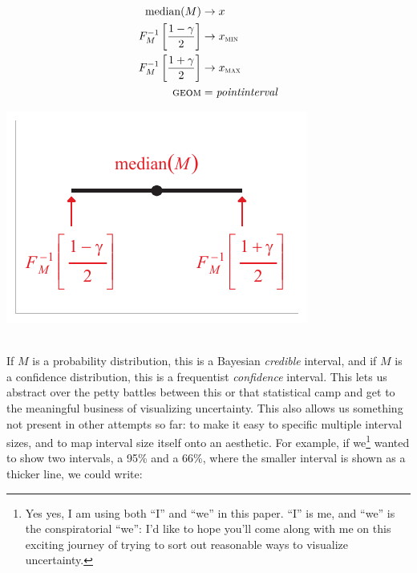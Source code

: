 \documentclass[journal]{vgtc}                     %
\newcommand{\equationfigure}[2]{%
\noindent
\begin{minipage}{.5\columnwidth}
\setlength{\abovedisplayskip}{0pt}
\setlength{\belowdisplayskip}{0pt}
#1\end{minipage}%
\begin{minipage}{.4\columnwidth}\centering #2 \end{minipage}%
\vspace{.5\belowdisplayskip}\\
}
\begin{document}
\equationfigure{
\begin{align*}
\operatorname{median}(M) &\rightarrow x\\
F_M^{-1}\left[\frac{1 - \gamma}{2}\right] &\rightarrow x_\textsc{min}\\
F_M^{-1}\left[\frac{1 + \gamma}{2}\right] &\rightarrow x_\textsc{max}\\
\textsc{geom} &= \mathit{pointinterval}
\end{align*}
}{\includegraphics[width=1.2\columnwidth]{figs/3-geom_pointinterval_quantiles.pdf}}
If $M$ is a probability distribution, this is a Bayesian \textit{credible }interval, and if $M$ is a confidence distribution, this is a frequentist \textit{confidence} interval. This lets us abstract over the petty battles between this or that statistical camp and get to the meaningful business of visualizing uncertainty. This also allows us something not present in other attempts so far: to make it easy to specific multiple interval sizes, and to map interval size itself onto an aesthetic. For example, if we\footnote{Yes yes, I am using both ``I'' and ``we'' in this paper. ``I'' is me, and ``we'' is the conspiratorial ``we'': I'd like to hope you'll come along with me on this exciting journey of trying to sort out reasonable ways to visualize uncertainty.} wanted to show two intervals, a 95\% and a 66\%, where the smaller interval is shown as a thicker line, we could write:
\end{document}
